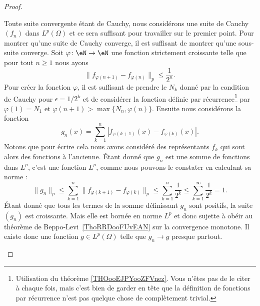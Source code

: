 \begin{proof}
\begin{subproof}

		Toute suite convergente étant de Cauchy, nous considérons une suite de Cauchy \( (f_n)\) dans \( L^p(\Omega)\) et ce sera suffisant pour travailler sur le premier point. Pour montrer qu'une suite de Cauchy converge, il est suffisant de montrer qu'une sous-suite converge. Soit \( \varphi\colon \eN\to \eN\) une fonction strictement croissante telle que pour tout \( n\geq 1\) nous ayons
		\begin{equation}
			\| f_{\varphi(n+1)}-f_{\varphi(n)} \|_p\leq \frac{1}{ 2^{n} }.
		\end{equation}
		Pour créer la fonction \( \varphi\), il est suffisant de prendre le \( N_k\) donné par la condition de Cauchy pour \( \epsilon=1/2^k\) et de considérer la fonction définie par récurrence\footnote{Utilisation du théorème \ref{THOooEJPYooZFVnez}. Vous n'êtes pas  de le citer à chaque fois, mais c'est bien de garder en tête que la définition de fonctions par récurrence n'est pas quelque chose de complètement trivial.} par \( \varphi(1)=N_1\) et \( \varphi(n+1)>\max\{ N_n,\varphi(n) \}\). Ensuite nous considérons la fonction
		\begin{equation}
			g_n(x)=\sum_{k=1}^n| f_{\varphi(k+1)}(x)-f_{\varphi(k)}(x) |.
		\end{equation}
		Notons que pour écrire cela nous avons considéré des représentants \( f_k\) qui sont alors des fonctions à l'ancienne. Étant donné que \( g_n\) est une somme de fonctions dans \( L^p\), c'est une fonction \( L^p\), comme nous pouvons le constater en calculant sa norme :
		\begin{equation}
			\| g_n \|_p\leq \sum_{k=1}^n\| f_{\varphi(k+1)}-f_{\varphi(k)} \|_p\leq\sum_{k=1}^n\frac{1}{ 2^k }\leq\sum_{k=1}^{\infty}\frac{1}{ 2^k }=1.
		\end{equation}
		Étant donné que tous les termes de la somme définissant \( g_n\) sont positifs, la suite \( (g_n)\) est croissante. Mais elle est bornée en norme \( L^p\) et donc sujette à obéir au théorème de Beppo-Levi~\ref{ThoRRDooFUvEAN} sur la convergence monotone. Il existe donc une fonction \( g\in L^p(\Omega)\) telle que \( g_n\to g\) presque partout.


\end{subproof}
\end{proof}
